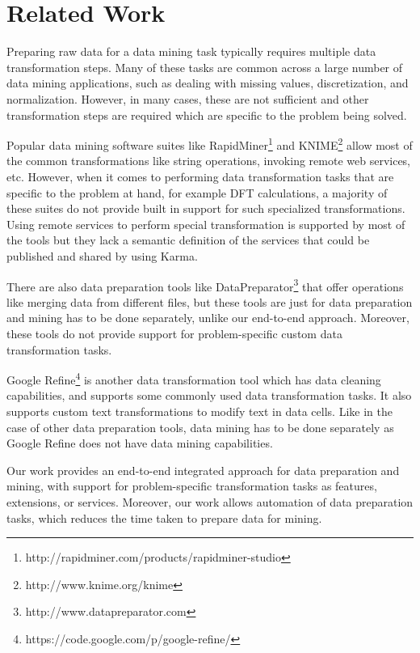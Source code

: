 \section{Related Work}

Preparing raw data for a data mining task typically requires multiple data transformation steps\cite{Fayyad:1996:DMK:257938.257942}. Many of these tasks are common across a large number of data mining applications, such as dealing with missing values, discretization, and normalization. However, in many cases, these are not sufficient and other transformation steps are required which are specific to the problem being solved.

Popular data mining software suites like RapidMiner\footnote{http://rapidminer.com/products/rapidminer-studio} and KNIME\footnote{http://www.knime.org/knime} allow most of the common transformations like string operations, invoking remote web services, etc. However, when it comes to performing data transformation tasks that are specific to the problem at hand, for example DFT calculations, a majority of these suites do not provide built in support for such specialized transformations. Using remote services to perform special transformation is supported by most of the tools but they lack a semantic definition of the services that could be published and shared by using Karma.

There are also data preparation tools like DataPreparator\footnote{http://www.datapreparator.com} that offer operations like merging data from different files, but these tools are just for data preparation and mining has to be done separately, unlike our end-to-end approach. Moreover, these tools do not provide support for problem-specific custom data transformation tasks.

Google Refine\footnote{https://code.google.com/p/google-refine/} is another data transformation tool which has data cleaning capabilities, and supports some commonly used data transformation tasks. It also supports custom text transformations to modify text in data cells. Like in the case of other data preparation tools, data mining has to be done separately as Google Refine does not have data mining capabilities.

Our work provides an end-to-end integrated approach for data preparation and mining, with support for problem-specific transformation tasks as features, extensions, or services. Moreover, our work allows automation of data preparation tasks, which reduces the time taken to prepare data for mining.